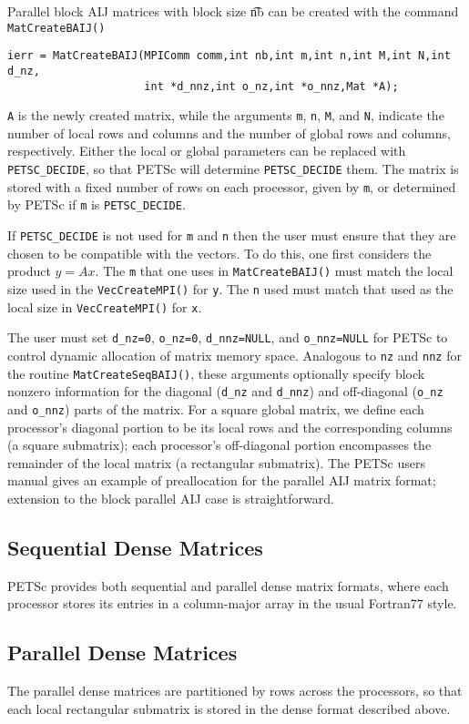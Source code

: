 Parallel block AIJ matrices with block size {\t nb} can be created with
the command \lstinline{MatCreateBAIJ()}
\begin{lstlisting}
ierr = MatCreateBAIJ(MPIComm comm,int nb,int m,int n,int M,int N,int d_nz,
                     int *d_nnz,int o_nz,int *o_nnz,Mat *A);
\end{lstlisting}
\lstinline{A} is the newly created matrix, while the arguments \lstinline{m}, \lstinline{n},
\lstinline{M}, and \lstinline{N}, indicate the number of local rows and columns and
the number of global rows and columns, respectively. Either the local or
global parameters can be replaced with \lstinline{PETSC_DECIDE}, so that
PETSc will determine \lstinline{PETSC_DECIDE} them.
The matrix is stored with a fixed number of rows on
each processor, given by \lstinline{m}, or determined by PETSc if \lstinline{m} is
\lstinline{PETSC_DECIDE}.

If \lstinline{PETSC_DECIDE} is not used for
\lstinline{m} and \lstinline{n} then the user must ensure that they are chosen to be
compatible with the vectors. To do this, one first considers the product
$y = A x$. The \lstinline{m} that one uses in \lstinline{MatCreateBAIJ()}
must match the local size used in the \lstinline{VecCreateMPI()} for \lstinline{y}.
The \lstinline{n} used must match that used as the local size in
\lstinline{VecCreateMPI()} for \lstinline{x}.

The user must set \lstinline{d_nz=0}, \lstinline{o_nz=0}, \lstinline{d_nnz=NULL}, and
\lstinline{o_nnz=NULL} for PETSc to control dynamic allocation of matrix
memory space.  Analogous to \lstinline{nz} and \lstinline{nnz} for the routine
\lstinline{MatCreateSeqBAIJ()}, these arguments optionally specify
block nonzero information for the diagonal (\lstinline{d_nz} and \lstinline{d_nnz}) and
off-diagonal (\lstinline{o_nz} and \lstinline{o_nnz}) parts of the matrix.
For a square global matrix, we define each processor's diagonal portion
to be its local rows and the corresponding columns (a square submatrix);
each processor's off-diagonal portion encompasses the remainder of the
local matrix (a rectangular submatrix).
The PETSc users manual gives an example of preallocation for
the parallel AIJ matrix format; extension to the block parallel AIJ case
is straightforward.

\subsection{Sequential Dense Matrices}

PETSc provides both sequential and parallel dense matrix formats,
where each processor stores its entries in a column-major array in the
usual Fortran77 style.

\subsection{Parallel Dense Matrices}

The parallel dense matrices are partitioned by rows across the
processors, so that each local rectangular submatrix is stored in the
dense format described above.





